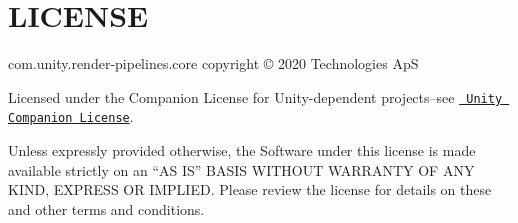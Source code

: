 \chapter{LICENSE}
\hypertarget{md__hey_tea_9_2_library_2_package_cache_2com_8unity_8render-pipelines_8core_0d14_80_88_2_l_i_c_e_n_s_e}{}\label{md__hey_tea_9_2_library_2_package_cache_2com_8unity_8render-pipelines_8core_0d14_80_88_2_l_i_c_e_n_s_e}
com.\+unity.\+render-\/pipelines.\+core copyright © 2020  Technologies ApS

Licensed under the  Companion License for Unity-\/dependent projects--see \href{http://www.unity3d.com/legal/licenses/Unity_Companion_License}{\texttt{ Unity Companion License}}.

Unless expressly provided otherwise, the Software under this license is made available strictly on an “\+AS IS” BASIS WITHOUT WARRANTY OF ANY KIND, EXPRESS OR IMPLIED. Please review the license for details on these and other terms and conditions. 